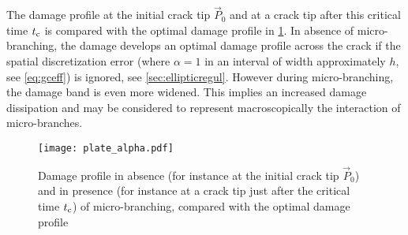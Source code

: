 The damage profile at the initial crack tip $\vec{P}_0$ and at a crack tip after this critical time $t_{\mathrm{c}}$ is compared with the optimal damage profile in \cref{fig:plate_alpha}. In absence of micro-branching, the damage develops an optimal damage profile across the crack if the spatial discretization error (where $\alpha=1$ in an interval of width approximately $h$, see \eqref{eq:gceff}) is ignored, see \cref{sec:ellipticregul}. However during micro-branching, the damage band is even more widened. This implies an increased damage dissipation and may be considered to represent macroscopically the interaction of micro-branches. 
\begin{figure}[htbp]
\centering
\texttt{[image: plate\_alpha.pdf]}
\caption{Damage profile in absence (for instance at the initial crack tip $\vec{P}_0$) and in presence (for instance at a crack tip just after the critical time $t_{\mathrm{c}}$) of micro-branching, compared with the optimal damage profile} \label{fig:plate_alpha}
\end{figure}

